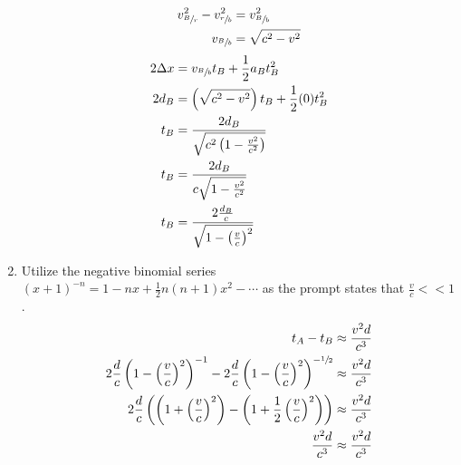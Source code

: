 \documentclass{article}
\begin{document}
\begin{enumerate}[label=\textbf{(\alph*)}]
		\begin{align*}
			v_{\sfrac{B}{r}}^2 - v_{\sfrac{r}{b}}^2 & = v_{\sfrac{B}{b}}^2 \\
			v_{\sfrac{B}{b}} & = \sqrt{c^2 - v^2}
		\end{align*}
		\begin{align*}
			2\Delta x & = v_{\sfrac{B}{b}}t_B + \frac{1}{2}a_Bt_B^2 \\
			2d_B & = \left( \sqrt{c^2 - v^2} \right) t_B + \frac{1}{2}(0)t_B^2 \\
			t_B & = \frac{2d_B}{\sqrt{c^2 \left( 1 - \frac{v^2}{c^2} \right) }} \\
			t_B & = \frac{2d_B}{c\sqrt{1 - \frac{v^2}{c^2}}} \\
			t_B & = \frac{ 2\frac{d_B}{c} }{ \sqrt{1 - \left( \frac{v}{c} \right)^2} }
		\end{align*}
	\item
		Utilize the negative binomial series $ (x + 1)^{-n} = 1 - nx + \frac{1}{2}n(n + 1)x^2 - \cdots $ as the prompt states that $ \frac{v}{c} << 1 $.
		\begin{align*}
			t_A - t_B & \approx \frac{v^2d}{c^3} \\
			2\frac{d}{c} \left( 1 - \left( \frac{v}{c} \right)^2 \right)^{-1} - 2\frac{d}{c} \left( 1 - \left( \frac{v}{c} \right)^2 \right)^{-\sfrac{1}{2}} & \approx \frac{v^2d}{c^3} \\
			2\frac{d}{c} \left( \left( 1 + \left( \frac{v}{c} \right)^2 \right) - \left( 1 + \frac{1}{2} \left( \frac{v}{c} \right)^2 \right) \right) & \approx \frac{v^2d}{c^3} \\
			\frac{v^2d}{c^3} & \approx \frac{v^2d}{c^3}
		\end{align*}
\end{enumerate}
\end{document}
